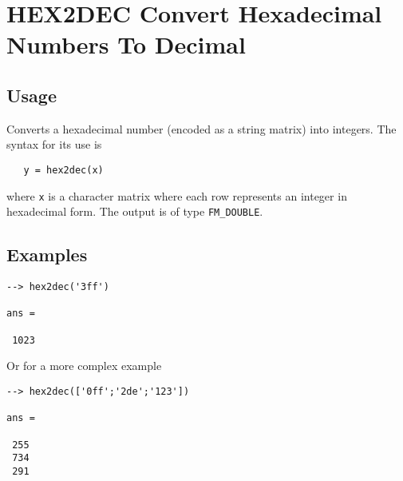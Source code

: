 \section{HEX2DEC Convert Hexadecimal Numbers To Decimal}

\subsection{Usage}

Converts a hexadecimal number (encoded as a string matrix) into integers.
The syntax for its use is
\begin{verbatim}
   y = hex2dec(x)
\end{verbatim}
where \verb|x| is a character matrix where each row represents an integer
in hexadecimal form.  The output is of type \verb|FM_DOUBLE|.
\subsection{Examples}

\begin{verbatim}
--> hex2dec('3ff')

ans = 

 1023 
\end{verbatim}
Or for a more complex example
\begin{verbatim}
--> hex2dec(['0ff';'2de';'123'])

ans = 

 255 
 734 
 291 
\end{verbatim}
